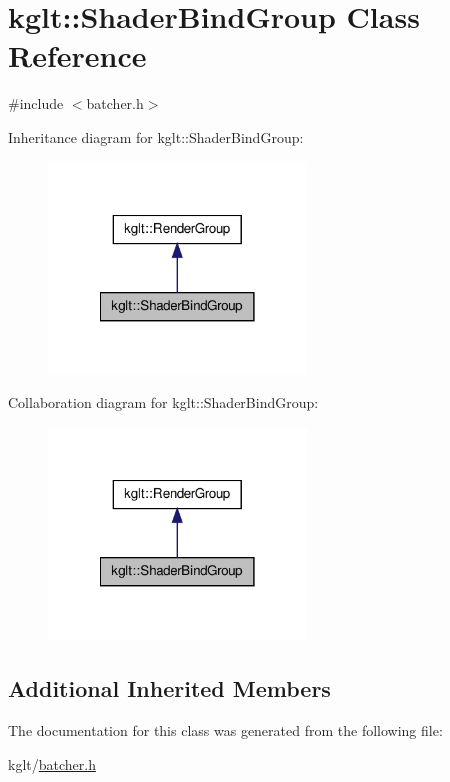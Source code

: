 \hypertarget{classkglt_1_1_shader_bind_group}{\section{kglt\-:\-:Shader\-Bind\-Group Class Reference}
\label{classkglt_1_1_shader_bind_group}
}


{\ttfamily \#include $<$batcher.\-h$>$}



Inheritance diagram for kglt\-:\-:Shader\-Bind\-Group\-:\nopagebreak
\begin{figure}[H]
\begin{center}
\leavevmode
\includegraphics[width=194pt]{classkglt_1_1_shader_bind_group__inherit__graph}
\end{center}
\end{figure}


Collaboration diagram for kglt\-:\-:Shader\-Bind\-Group\-:\nopagebreak
\begin{figure}[H]
\begin{center}
\leavevmode
\includegraphics[width=194pt]{classkglt_1_1_shader_bind_group__coll__graph}
\end{center}
\end{figure}
\subsection*{Additional Inherited Members}


The documentation for this class was generated from the following file\-:\begin{DoxyCompactItemize}
\item 
kglt/\hyperlink{batcher_8h}{batcher.\-h}\end{DoxyCompactItemize}
